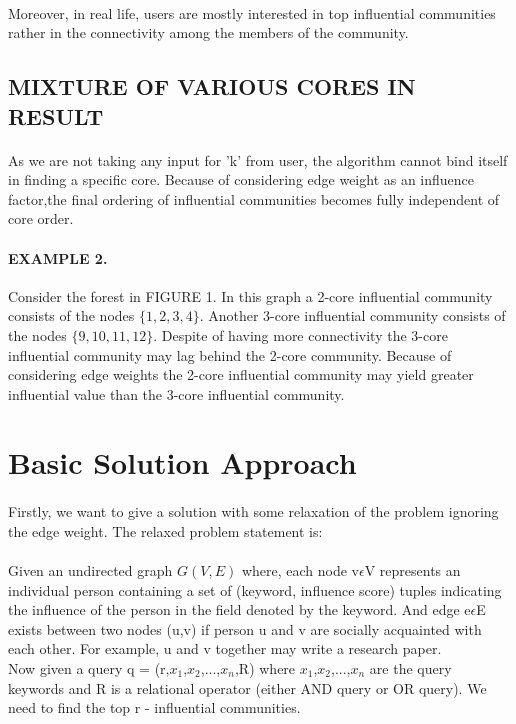 \documentclass{article}
\begin{document}
	\paragraph{}Moreover, in real life, users are mostly interested in top influential communities rather in the connectivity among the members of the community.  
	
	\subsection{MIXTURE OF VARIOUS CORES IN RESULT}
	\paragraph{}As we are not taking any input for 'k' from user, the algorithm cannot bind itself in finding a specific core. Because of considering edge weight as an influence factor,the final ordering of influential communities becomes fully independent of core order. 
	\paragraph{EXAMPLE 2.}Consider the forest in FIGURE 1. In this graph a 2-core influential community consists of the nodes ${\{1,2,3,4\}}$. Another 3-core influential community consists of the nodes ${\{9,10,11,12\}}$. Despite of having more connectivity the 3-core influential community may lag behind the 2-core community. Because of considering edge weights the 2-core influential community may yield greater influential value than the 3-core influential community. 
	
	\section{Basic Solution Approach}
	\paragraph{}Firstly, we want to give a solution with some relaxation of the problem ignoring the edge weight. The relaxed problem statement is:
	\paragraph{}Given an undirected graph $G(V,E)$ where, each node v$\epsilon$V represents an individual person containing a set of (keyword, influence score) tuples indicating the influence of the person in the field denoted by the keyword. And edge e$\epsilon$E exists between two nodes (u,v) if person u and v are socially acquainted with each other. For example, u and v together may write a research paper.
	\\
	Now given a query q = (r,$x_{1}$,$x_{2}$,...,$x_{n}$,R) where $x_{1}$,$x_{2}$,...,$x_{n}$ are the query keywords and R is a relational operator (either AND query or OR query). We need to find the top r - influential communities.
\end{document}
